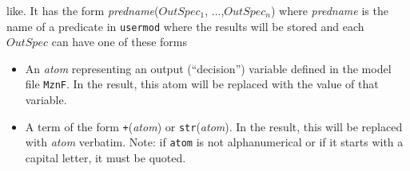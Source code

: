 \begin{itemize}
\begin{itemize}
    like. It has the form \emph{predname}($OutSpec_1$, ...,$OutSpec_n$)
    where \emph{predname} is the name of a predicate in \texttt{usermod}
    where the results will be stored  and each $OutSpec$ can have one of
    these forms
    \begin{itemize}
    \item  An \emph{atom} representing an output (``decision'') variable
      defined in the model file \texttt{MznF}.
      In the result, this atom will be replaced with the value of that variable.
    \item  A term of the form \texttt{+}(\emph{atom}) or
      \texttt{str}(\emph{atom}).  In the result, this will be replaced with
      \emph{atom} verbatim. Note: if \texttt{atom} is not alphanumerical or
      if it starts with a capital letter, it must be quoted.


\end{itemize}
\end{itemize}
\end{itemize}
